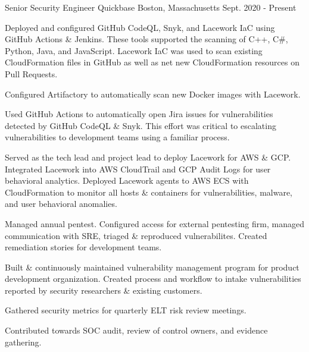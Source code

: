 

\begin{cventries}
\vspace{-3mm}
  \cventry
    {Senior Security Engineer} %
    {Quickbase} %
    {Boston, Massachusetts} %
    {Sept. 2020 - Present} %
    {
      \begin{cvitems} %
        \item {
            Deployed and configured GitHub CodeQL, Snyk, and Lacework IaC using GitHub Actions \& Jenkins. These tools supported the scanning of C++, C\#, Python, Java, and JavaScript. Lacework IaC was used to scan existing CloudFormation files in GitHub as well as net new CloudFormation resources on Pull Requests.
        }
        \item {
            Configured Artifactory to automatically scan new Docker images with Lacework.
        }
        \item {
            Used GitHub Actions to automatically open Jira issues for vulnerabilities detected by GitHub CodeQL \& Snyk. This effort was critical to escalating vulnerabilities to development teams using a familiar process.
        }
        \item {
            Served as the tech lead and project lead to deploy Lacework for AWS \& GCP. Integrated Lacework into AWS CloudTrail and GCP Audit Logs for user behavioral analytics. Deployed Lacework agents to AWS ECS with CloudFormation to monitor all hosts \& containers for vulnerabilities, malware, and user behavioral anomalies.
        }
        \item {
            Managed annual pentest. Configured access for external pentesting firm, managed communication with SRE, triaged \& reproduced vulnerabilites. Created remediation stories for development teams.
        }
        \item {
            Built \& continuously maintained vulnerability management program for product development organization. Created process and workflow to intake vulnerabilities reported by security researchers \& existing customers.
        }
        \item {
            Gathered security metrics for quarterly ELT risk review meetings.
        }
        \item {
            Contributed towards SOC audit, review of control owners, and evidence gathering.
        }
      \end{cvitems}
    }


\end{cventries}
